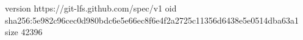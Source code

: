 version https://git-lfs.github.com/spec/v1
oid sha256:5e982c96cec0d980bdc6e5e66ec8f6e4f2a2725c11356d6438e5e0514dba63a1
size 42396
